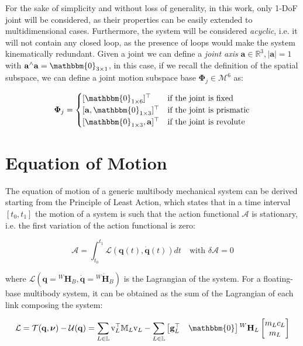 For the sake of simplicity and without loss of generality, in this work, only 1-\ac{DoF} joint will be considered, as their properties can be easily extended to multidimensional cases. Furthermore, the system will be considered \textit{acyclic}, i.e. it will not contain any closed loop, as the presence of loops would make the system kinematically redundant.
Given a joint we can define a \textit{joint axis} $\mathbf{a} \in \mathbb{R}^3, |\mathbf{a}| = 1$ with $\mathbf{a}^\wedge \mathbf{a} = \mathbbm{0}_{3 \times 1}$, in this case, if we recall the definition of the spatial subspace, we can define a joint motion subspace base $\boldsymbol{\Phi} _j \in \mathcal{M} ^6$ as:

\begin{equation}
    \boldsymbol{\Phi} _j =
    \begin{cases}
        [\mathbbm{0}_{1 \times 6}] ^\top             & \text{if the joint is fixed}     \\
        [\mathbf{a}, \mathbbm{0}_{1 \times 3}] ^\top & \text{if the joint is prismatic} \\
        [\mathbbm{0}_{1 \times 3}, \mathbf{a}] ^\top & \text{if the joint is revolute}
    \end{cases}
\end{equation}

\section{Equation of Motion}
\label{sec:back_eom}

The equation of motion of a generic multibody mechanical system can be derived starting from the Principle of Least Action, which states that in a time interval $[t _0, t _1]$ the motion of a system is such that the action functional $\mathcal{A}$ is stationary, i.e. the first variation of the action functional is zero:

\begin{equation}
    \mathcal{A} = \int _{t _0} ^{t _1} \mathcal{L} (\mathbf{q}(t), \mathbf{\dot{q}}(t)) dt \quad \text{with } \delta \mathcal{A} = 0
\end{equation}

where $\mathcal{L} (\mathbf{q} = {}^W\mathbf{H} _B, \dot{\mathbf{q}} = {}^W\dot{\mathbf{H}} _B)$ is the Lagrangian of the system. For a floating-base multibody system, it can be obtained as the sum of the Lagrangian of each link composing the system:

\begin{equation}
    \mathcal{L} = \mathcal{T}(\mathbf{q},\boldsymbol{\nu}) - \mathcal{U}(\mathbf{q}) = \sum _{L \in \mathbb{L}} \mathrm{v} ^\top _L \mathbb{M} _L \mathrm{v} _L - \sum _{L \in \mathbb{L}} \begin{bmatrix}
        \mathbf{g} ^\top _L & \mathbbm{0}
    \end{bmatrix} {}^W\mathbf{H} _L
    \begin{bmatrix}
        m _L c _L \\ m _L
    \end{bmatrix}
\end{equation}

